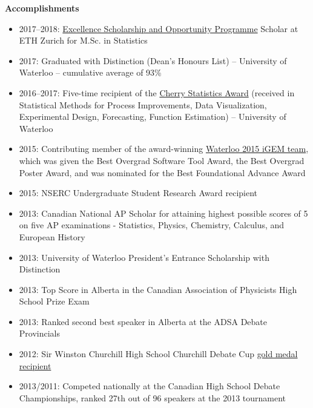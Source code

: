 \documentclass[letterpaper,11pt]{article}
\newcommand{\resheading}[1]{\colorbox{resBlue}{\begin{minipage}{\textwidth}
			\textbf{#1}
\end{minipage}} \vspace{-14pt}}
\begin{document}
\resheading{Accomplishments}
\vspace{4pt}
{\footnotesize
\begin{itemize}
	\item 2017--2018: \href{https://www.ethz-foundation.ch/en/esop/}{Excellence Scholarship and Opportunity Programme} Scholar at ETH Zurich for M.Sc. in Statistics
	\item 2017: Graduated with Distinction (Dean's Honours List) -- University of Waterloo -- cumulative average of 93\%
	\item 2016--2017: Five-time recipient of the \href{https://uwaterloo.ca/student-awards-financial-aid/awards/winston-and-diana-cherry-awards-statistics}{Cherry Statistics Award} (received in Statistical Methods for Process Improvements, Data Visualization, Experimental Design, Forecasting, Function Estimation) -- University of Waterloo
	\item 2015: Contributing member of the award-winning \href{http://2015.igem.org/Team:Waterloo}{Waterloo 2015 iGEM team}, which was given the Best Overgrad Software Tool Award, the Best Overgrad Poster Award, and was nominated for the Best Foundational Advance Award
	\item 2015: NSERC Undergraduate Student Research Award recipient
	\item 2013: Canadian National AP Scholar for attaining highest possible scores of 5 on five AP examinations - Statistics, Physics, Chemistry, Calculus, and European History
	\item 2013: University of Waterloo President's Entrance Scholarship with Distinction
	\item 2013: Top Score in Alberta in the Canadian Association of Physicists High School Prize Exam
	\item 2013: Ranked second best speaker in Alberta at the ADSA Debate Provincials
	\item 2012: Sir Winston Churchill High School Churchill Debate Cup  \href{http://www.calgaryherald.com/life/Honours+handed+Winston+Churchill+Society+Calgary+dinner/8742754/story.html}{gold medal recipient}
	\item 2013/2011: Competed nationally at the Canadian High School Debate Championships, ranked 27th out of 96 speakers at the 2013 tournament
\end{itemize}}
\end{document}
